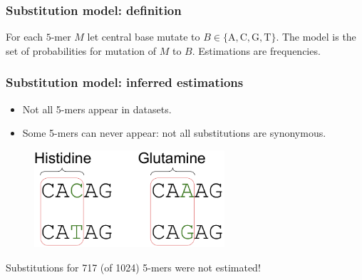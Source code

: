 \documentclass{beamer}\usepackage[]{graphicx}\usepackage[]{color}
\begin{document}
\begin{frame}
    \frametitle{Substitution model: definition}
    For each $5$-mer $M$ let central base mutate to $B \in \{\mathrm A, \mathrm  C,  \mathrm G, \mathrm T\}$.
    The model is the set of probabilities for mutation of $M$ to $B$.
    Estimations are frequencies.

\end{frame}

\begin{frame}
    \frametitle{Substitution model: inferred estimations}
    \begin{itemize}
        \item Not all 5-mers appear in datasets.
        \item Some 5-mers can never appear: not all substitutions are synonymous.
   \end{itemize}
  \begin{figure}[h]
      \center\includegraphics[width=200pt]{Pictures/synonymous_mutations.pdf}
 \end{figure}
   \pause
   \bigskip
       { \color{blue} Substitutions for 717 (of 1024) 5-mers were not estimated! }
\end{frame}
\end{document}
